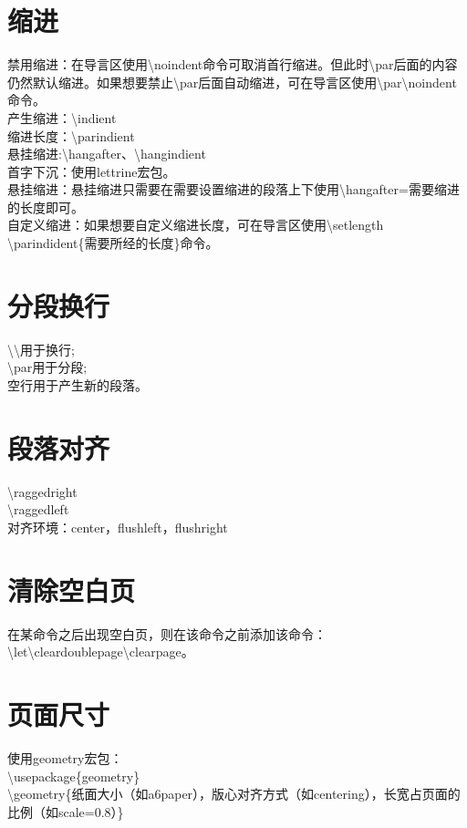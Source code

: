 \documentclass{book}%
\begin{document}
    \section{缩进}
    禁用缩进：在导言区使用\textbackslash noindent命令可取消首行缩进。但此时\textbackslash par后面的内容仍然默认缩进。如果想要禁止\textbackslash par后面自动缩进，可在导言区使用\textbackslash par\textbackslash noindent命令。\\
    产生缩进：\textbackslash indient\\
    缩进长度：\textbackslash parindient\\
    悬挂缩进:\textbackslash hangafter、\textbackslash hangindient\\
    首字下沉：使用lettrine宏包。\\
    悬挂缩进：悬挂缩进只需要在需要设置缩进的段落上下使用\textbackslash hangafter=需要缩进的长度即可。\\
    自定义缩进：如果想要自定义缩进长度，可在导言区使用\textbackslash setlength \textbackslash parindident\{需要所经的长度\}命令。\\
    
    \section{分段换行}
    \textbackslash \textbackslash 用于换行;\\
    \textbackslash par用于分段;\\
    空行用于产生新的段落。
           
    \section{段落对齐}
    \textbackslash raggedright\\
    \textbackslash raggedleft\\
    对齐环境：center，flushleft，flushright
       
    \section{清除空白页}
    在某命令之后出现空白页，则在该命令之前添加该命令：\textbackslash let\textbackslash cleardoublepage\textbackslash clearpage。
    
    \section{页面尺寸}
    使用geometry宏包：\\
    \textbackslash usepackage\{geometry\}\\
    \textbackslash geometry\{纸面大小（如a6paper），版心对齐方式（如centering），长宽占页面的比例（如scale=0.8）\}\\
          
\end{document}
